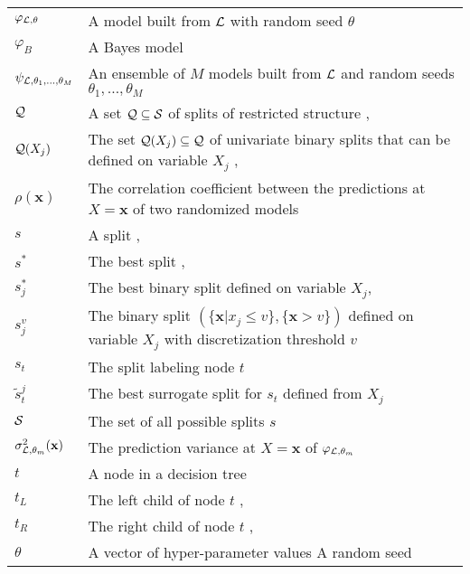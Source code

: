 \begin{tabularx}{\textwidth}{ l X }
$\varphi_{{\cal L},\theta}$ & A model built from ${\cal L}$ with random seed $\theta$ \dotfill  \pageref{ntn:varphi-Ltheta}\\
$\varphi_B$ & A Bayes model \dotfill  \pageref{ntn:varphi-B}\\
$\psi_{{\cal L},\theta_1,\dots,\theta_M}$ & An ensemble of $M$ models built from ${\cal L}$ and random seeds $\theta_1, \dots, \theta_M$ \dotfill \pageref{ntn:psi} \\
${\cal Q}$ & A set ${\cal Q} \subseteq {\cal S}$ of splits of restricted structure \dotfill \pageref{ntn:Q}, \pageref{ntn:Q2}\\
${\cal Q}(X_j)$ & The set ${\cal Q}(X_j) \subseteq {\cal Q}$ of univariate binary splits that can be defined on variable $X_j$ \dotfill \pageref{eqn:q:ordered}, \pageref{eqn:q:categorical-cart}\\
$\rho(\mathbf{x})$ & The correlation coefficient between the predictions at $X=\mathbf{x}$ of two randomized models \dotfill \pageref{eqn:4:correlation} \\
$s$ & A split \dotfill  \pageref{ntn:s}, \pageref{ntn:s2}\\
$s^*$ & The best split \dotfill  \pageref{ntn:s-star}, \pageref{eqn:best-best-split}\\
$s^*_j$ & The best binary split defined on variable $X_j$\dotfill  \pageref{ntn:s-star}, \pageref{eqn:best-split-single}\\
$s_j^v$ & The binary split $(\{\mathbf{x}|x_j \leq v\}, \{\mathbf{x} > v\})$ defined on variable $X_j$ with discretization threshold $v$ \dotfill  \pageref{ntn:s_jv}\\
$s_t$ & The split labeling node $t$ \dotfill  \pageref{ntn:s_t}\\
$\tilde{s}^j_t$ & The best surrogate split for $s_t$ defined from $X_j$ \dotfill \pageref{ntn:s-surrogate}\\
${\cal S}$ & The set of all possible splits $s$ \dotfill  \pageref{ntn:S-all}\\
$\sigma^2_{{\cal L},\theta_m}(\mathbf{x})$ & The prediction variance at $X = \mathbf{x}$ of $\varphi_{{\cal L},\theta_m}$ \dotfill \pageref{eqn:4:sigma} \\
$t$ & A node in a decision tree \dotfill  \pageref{ntn:node}\\
$t_L$ & The left child of node $t$ \dotfill \pageref{ntn:t_L}, \pageref{ntn:t_L2}\\
$t_R$ & The right child of node $t$ \dotfill \pageref{ntn:t_R}, \pageref{ntn:t_R2}\\
$\theta$ & A vector of hyper-parameter values \dotfill  \pageref{ntn:theta}\newline A random seed \dotfill \pageref{ntn:theta-seed}\\

\end{tabularx}
